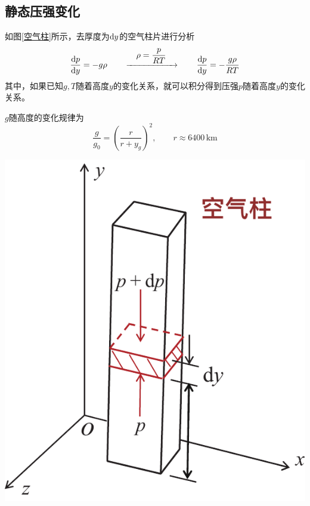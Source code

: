 {
	\centering
\begin{minipage}{0.7\linewidth}
	\subsection{静态压强变化}
	\hspace*{2em} 如图\ref{空气柱}所示，去厚度为${\rm{d}} y$的空气柱片进行分析
	\begin{equation}
		\dfrac{{\rm{d}} p}{{\rm{d}} y} = - g \rho \qquad \xrightarrow{\quad \textstyle \rho = \dfrac{p}{RT} \quad } \qquad \dfrac{{\rm{d}} p}{{\rm{d}} y} = - \dfrac{g \rho }{RT}
	\end{equation}
	其中，如果已知$g,T$随着高度$y$的变化关系，就可以积分得到压强$p$随着高度$y$的变化关系。
	
	\hspace*{2em}$g$随高度的变化规律为
	\begin{equation*}
		\dfrac{g}{g_0} = \left(\dfrac{r}{r+y_g}\right)^2, \qquad r \approx 6400\, \text{km}
	\end{equation*}
\end{minipage}
\begin{minipage}{0.3\linewidth}
		\includegraphics[width=\linewidth]{pic/空气柱.pdf}
		\label{空气柱}
\end{minipage}
}

